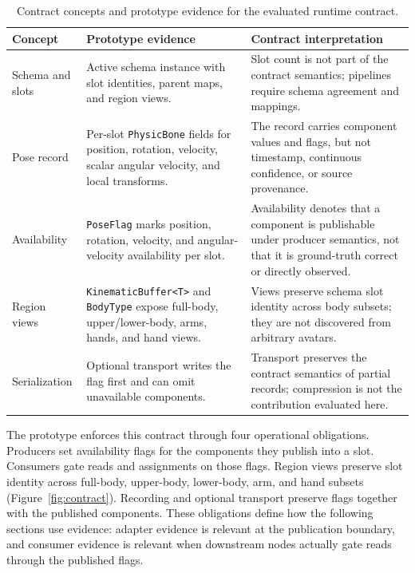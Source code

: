 \documentclass[runningheads]{llncs}
\begin{document}
\begin{table}[t]
	\caption{Contract concepts and prototype evidence for the evaluated runtime contract.}\label{tab:contract}
	\centering
	\scriptsize
	\begin{tabular}{@{}P{23mm}P{48mm}P{48mm}@{}}
		\toprule
		Concept          & Prototype evidence                                                                                                   & Contract interpretation                                                                                                                  \\
		\midrule
		Schema and slots & Active schema instance with slot identities, parent maps, and region views.                                          & Slot count is not part of the contract semantics; pipelines require schema agreement and mappings.                                       \\
		Pose record      & Per-slot \texttt{PhysicBone} fields for position, rotation, velocity, scalar angular velocity, and local transforms. & The record carries component values and flags, but not timestamp, continuous confidence, or source provenance.                           \\
		Availability     & \texttt{PoseFlag} marks position, rotation, velocity, and angular-velocity availability per slot.                    & Availability denotes that a component is publishable under producer semantics, not that it is ground-truth correct or directly observed. \\
		Region views     & \texttt{KinematicBuffer<T>} and \texttt{BodyType} expose full-body, upper/lower-body, arms, hands, and hand views.   & Views preserve schema slot identity across body subsets; they are not discovered from arbitrary avatars.                                 \\
		Serialization    & Optional transport writes the flag first and can omit unavailable components.                                        & Transport preserves the contract semantics of partial records; compression is not the contribution evaluated here.                       \\
		\bottomrule
	\end{tabular}
\end{table}

The prototype enforces this contract through four operational obligations. Producers set availability flags for the components they publish into a slot. Consumers gate reads and assignments on those flags. Region views preserve slot identity across full-body, upper-body, lower-body, arm, and hand subsets (Figure~\ref{fig:contract}). Recording and optional transport preserve flags together with the published components. These obligations define how the following sections use evidence: adapter evidence is relevant at the publication boundary, and consumer evidence is relevant when downstream nodes actually gate reads through the published flags.
\end{document}
